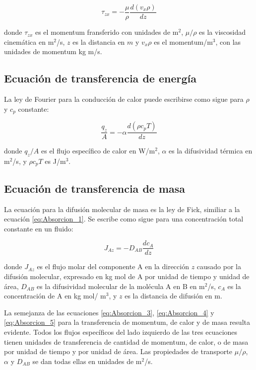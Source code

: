 \documentclass[11pt]{book}
\begin{document}
\begin{equation}
    \label{eq:Absorcion_3}
    \tau_{zx} = - \frac{\mu}{\rho} \frac{d (v_x \rho )}{dz}
\end{equation}

donde $\tau_{zx}$ es el momentum fransferido con unidades de m$^2$, $\mu/\rho$ es la viscosidad cinemática en m$^2$/s, $z$ es la distancia en $m$ y $v_x \rho$ es el momentum/m$^3$, con las unidades de momentum kg m/s.

\subsection{Ecuación de transferencia de energía}

La ley de Fourier para la conducción de calor puede escribirse como sigue para $\rho$ y $c_p$ constante:

\begin{equation}
    \label{eq:Absorcion_4}
    \frac{q_z}{A} = - \alpha \frac{d (\rho c_p T)}{dz}
\end{equation}

donde $q_z/A$ es el flujo específico de calor en W/m$^2$, $\alpha$ es la difusividad térmica en m$^2$/s, y $\rho c_p T$ es J/m$^3$. 

\subsection{Ecuación de transferencia de masa}

La ecuación para la difusión molecular de masa es la ley de Fick, similiar a la ecuación \ref{eq:Absorcion_1}. Se escribe como sigue para una concentración total constante en un fluido:

\begin{equation}
    \label{eq:Absorcion_5}
    J_{Az} = -D_{AB} \frac{d c_A}{dz}
\end{equation}

donde $J_{Az}$ es el flujo molar del componente A en la dirección $z$ causado por la difusión molecular, expresado en kg mol de A por unidad de tiempo y unidad de área, $D_{AB}$ es la difusividad molecular de la molécula A en B en m$^2$/s, $c_A$ es la concentración de A en kg mol/ m$^3$, y $z$ es la distancia de difusión en m. 

La semejanza de las ecuaciones \ref{eq:Absorcion_3}, \ref{eq:Absorcion_4} y \ref{eq:Absorcion_5} para la transferencia de momentum, de calor y de masa resulta evidente. Todos los flujos específicos del lado izquierdo de las tres ecuaciones tienen unidades de transferencia de cantidad de momentum, de calor, o de masa por unidad de tiempo y por unidad de área. Las propiedades de transporte $\mu/\rho$, $\alpha$ y $D_{AB}$ se dan todas ellas en unidades de m$^2$/s.
\end{document}

